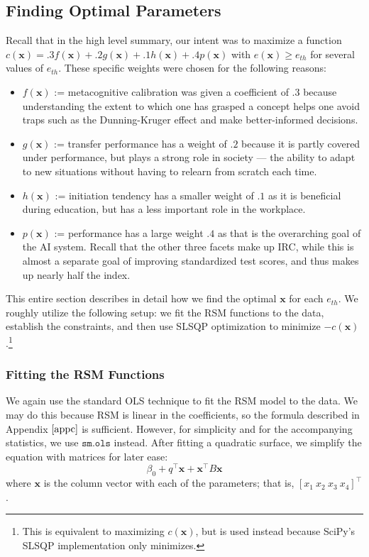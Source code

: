 \documentclass[12pt]{article}
\newcommand{\m}[1]{\mathbf{#1}}
\begin{document}
\subsection{Finding Optimal Parameters}\label{sec2.5}
Recall that in the high level summary, our intent was to maximize a function $c(\m{x}) = .3f(\m x) + .2g(\m x) + .1h(\m x) + .4p(\m x)$ with $e(\m x) \ge e_{th}$ for several values of $e_{th}$. These specific weights were chosen for the following reasons:
\begin{itemize}
    \item $f(\m x)$ := metacognitive calibration was given a coefficient of $.3$ because understanding the extent to which one has grasped a concept helps one avoid traps such as the Dunning-Kruger effect \cite{Wikipedia_2026} and make better-informed decisions.
    \item $g (\m x)$ := transfer performance has a weight of $.2$ because it is partly covered under performance, but plays a strong role in society --- the ability to adapt to new situations without having to relearn from scratch each time.
    \item $h(\m x)$ := initiation tendency has a smaller weight of $.1$ as it is beneficial during education, but has a less important role in the workplace.
    \item $p(\m x)$ := performance has a large weight $.4$ as that is the overarching goal of the AI system. Recall that the other three facets make up IRC, while this is almost a separate goal of improving standardized test scores, and thus makes up nearly half the index.
\end{itemize}
This entire section describes in detail how we find the optimal $\m x$ for each $e_{th}$. We roughly utilize the following setup: we fit the RSM functions to the data, establish the constraints, and then use SLSQP optimization to minimize $-c(\m x)$.\footnote{This is equivalent to maximizing $c (\m x)$, but is used instead because SciPy's SLSQP implementation only minimizes.}

\subsubsection{Fitting the RSM Functions}

We again use the standard OLS technique to fit the RSM model to the data. We may do this because RSM is linear in the coefficients, so the formula described in Appendix $\ref{appc}$ is sufficient. However, for simplicity and for the accompanying statistics, we use $\texttt{sm.ols}$ instead. After fitting a quadratic surface, we simplify the equation with matrices for later ease:
\[
\beta_0 + q^\top \m x + \m x^\top B \m x
\]
where $\m x$ is the column vector with each of the parameters; that is, $[x_1 \ x_2 \ x_3 \ x_4]^\top$.
\end{document}
